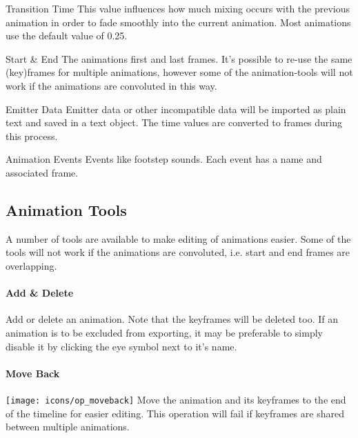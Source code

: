 \begin{propertyAurora}{Transition Time}
    This value influences how much mixing occurs with the previous animation in order to 
    fade smoothly into the current animation. Most animations use the default value of 0.25.
\end{propertyAurora}

\begin{propertyAurora}{Start \& End}
    The animations first and last frames. It's possible to re-use the same (key)frames for 
    multiple animations, however some of the animation-tools will not work if the animations are 
    convoluted in this way.
\end{propertyAurora}

\begin{propertyAurora}{Emitter Data}
    Emitter data or other incompatible data will be imported as plain text and saved in a text object. The
    time values are converted to frames during this process.
\end{propertyAurora}

\begin{propertyAurora}{Animation Events}
    Events like footstep sounds. Each event has a name and associated frame.
\end{propertyAurora}

\subsection{Animation Tools}
A number of tools are available to make editing of animations easier. Some 
of the tools will not work if the animations are convoluted, i.e. start and 
end frames are overlapping.

\paragraph{Add \& Delete} Add or delete an animation. Note that the keyframes will be deleted too. If an animation is to be excluded from exporting, it may be preferable to simply disable it by clicking the eye symbol next to it's name.

\paragraph{Move Back}{\texttt{[image: icons/op\_moveback]}} Move the animation and its keyframes to the end of the timeline for easier editing. This operation will fail if keyframes are shared between multiple animations.

